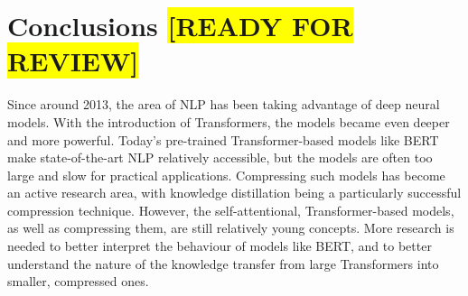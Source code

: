 \documentclass[bsc,frontabs,twoside,singlespacing,parskip,deptreport]{infthesis}
\def\reviewready{\colorbox{yellow}{[READY FOR REVIEW]}}
\begin{document}
{{    %
  }

  \section{Conclusions \reviewready}{
    Since around 2013, the area of NLP has been taking advantage of deep neural models.
    With the introduction of Transformers, the models became even deeper and more powerful.
    Today's pre-trained Transformer-based models like BERT make state-of-the-art NLP relatively accessible, but the models are often too large and slow for practical applications.
    Compressing such models has become an active research area, with knowledge distillation being a particularly successful compression technique.
    However, the self-attentional, Transformer-based models, as well as compressing them, are still relatively young concepts.
    More research is needed to better interpret the behaviour of models like BERT, and to better understand the nature of the knowledge transfer from large Transformers into smaller, compressed ones.
  }
}
\end{document}
